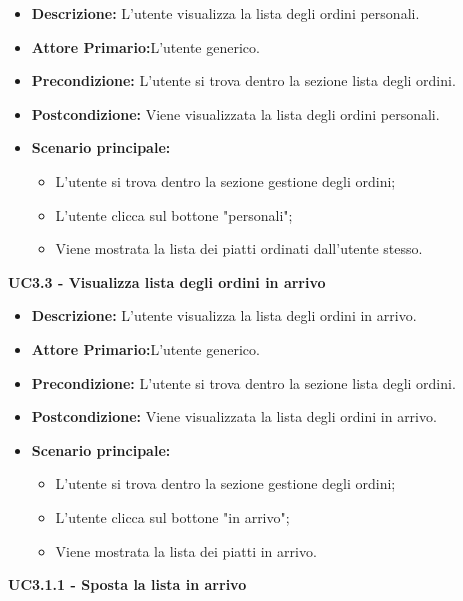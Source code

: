 \begin{itemize}
    \item \textbf{Descrizione:} L'utente visualizza la lista degli ordini personali.
    \item \textbf{Attore Primario:}L'utente generico.
    \item \textbf{Precondizione:} L'utente si trova dentro la sezione lista degli ordini.
    \item \textbf{Postcondizione:} Viene visualizzata la lista degli ordini personali.
    \item \textbf{Scenario principale:}
    \begin{itemize}
        \item L'utente si trova dentro la sezione gestione degli ordini;
        \item L'utente clicca sul bottone "personali";
        \item Viene mostrata la lista dei piatti ordinati dall'utente stesso.
    \end{itemize}
\end{itemize}
\textbf{UC3.3 - Visualizza lista degli ordini in arrivo}
\begin{itemize}
    \item \textbf{Descrizione:} L'utente visualizza la lista degli ordini in arrivo.
    \item \textbf{Attore Primario:}L'utente generico.
    \item \textbf{Precondizione:} L'utente si trova dentro la sezione lista degli ordini.
    \item \textbf{Postcondizione:} Viene visualizzata la lista degli ordini in arrivo.
    \item \textbf{Scenario principale:}
    \begin{itemize}
        \item L'utente si trova dentro la sezione gestione degli ordini;
        \item L'utente clicca sul bottone "in arrivo";
        \item Viene mostrata la lista dei piatti in arrivo.
    \end{itemize}
\end{itemize}
\textbf{UC3.1.1 - Sposta la lista in arrivo}
